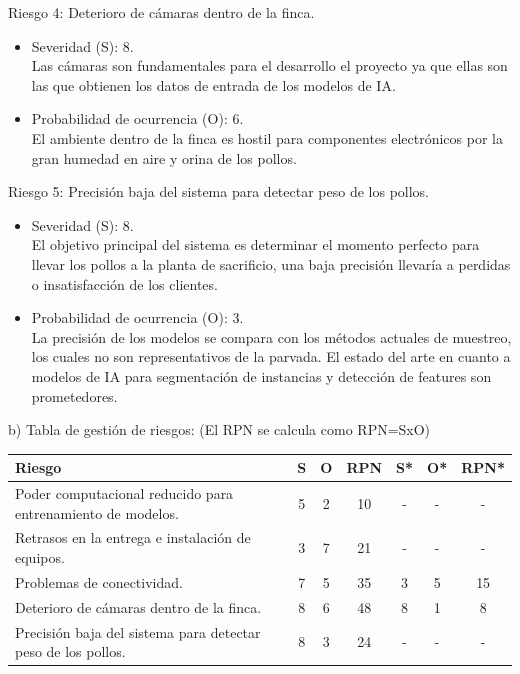 \documentclass[
11pt, %
]{charter}
\begin{document}
Riesgo 4: Deterioro de cámaras dentro de la finca.
\begin{itemize}
	\item Severidad (S):  8.\\
	Las cámaras son fundamentales para el desarrollo el proyecto ya que ellas son las que obtienen los datos de entrada de los modelos de IA.
	\item Probabilidad de ocurrencia (O): 6.\\
	El ambiente dentro de la finca es hostil para componentes electrónicos por la gran humedad en aire y orina de los pollos.
\end{itemize}

Riesgo 5: Precisión baja del sistema para detectar peso de los pollos.
\begin{itemize}
	\item Severidad (S):  8.\\
	El objetivo principal del sistema es determinar el momento perfecto para llevar los pollos a la planta de sacrificio, una baja precisión llevaría a perdidas o insatisfacción de los clientes.
	\item Probabilidad de ocurrencia (O): 3.\\
	La precisión de los modelos se compara con los métodos actuales de muestreo, los cuales no son representativos de la parvada. El estado del arte en cuanto a modelos de IA para segmentación de instancias y detección de features son prometedores.
\end{itemize}


b) Tabla de gestión de riesgos:      (El RPN se calcula como RPN=SxO)

\begin{table}[htpb]
\centering
\begin{tabularx}{\linewidth}{@{}|X|c|c|c|c|c|c|@{}}
\hline
\rowcolor[HTML]{C0C0C0} 
Riesgo & S & O & RPN & S* & O* & RPN* \\ \hline
Poder computacional reducido para entrenamiento de modelos.       & 5  &  2 & 10    & -   &  -  & -     \\ \hline
Retrasos en la entrega e instalación de equipos.       & 3  & 7  & 21    & -   & -   & -     \\ \hline
Problemas de conectividad.       & 7  & 5  &  35   & 3   & 5   &  15    \\ \hline
Deterioro de cámaras dentro de la finca.       & 8  & 6  &  48   & 8   & 1   & 8     \\ \hline
Precisión baja del sistema para detectar peso de los pollos.       & 8  & 3  &   24  & -   &  -  &   -   \\ \hline
\end{tabularx}%
\end{table}
\end{document}
